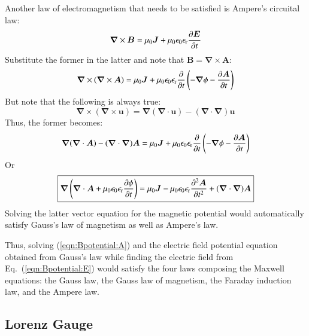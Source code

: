 \documentclass{warpdoc}
\newcommand\frameeqn[1]{\fbox{$\displaystyle #1$}}
\renewcommand{\vec}[1]{\bm{#1}}
\begin{document}
Another law of electromagnetism that needs to be satisfied is Ampere's circuital law:
%
\begin{equation}
\vec{\nabla} \times \vec{B} = \mu_0 \vec{J} + \mu_0 \epsilon_0 \epsilon_{\rm r} \frac{\partial \vec{E}}{\partial t}
\label{eqn:amperelaw}
\end{equation}
% 
Substitute the former in the latter and note that $\vec{B}=\vec{\nabla}\times\vec{A}$:
%
\begin{equation}
\vec{\nabla} \times (\vec{\nabla}\times\vec{A}) = \mu_0 \vec{J} + \mu_0 \epsilon_0 \epsilon_{\rm r} \frac{\partial }{\partial t}\left(-\vec{\nabla} \phi -\frac{\partial \vec{A}}{\partial t} \right)
\end{equation}
% 
But note that the following is always true:
%
\begin{equation}
\vec{\nabla} \times (\vec{\nabla} \times \vec{u})= \vec{\nabla}(\vec{\nabla}\cdot\vec{u}) -  (\vec{\nabla}\cdot\vec{\nabla}) \vec{u}
\end{equation}
%
Thus, the former becomes:
%
\begin{equation}
\vec{\nabla}(\vec{\nabla}\cdot\vec{A}) -  (\vec{\nabla}\cdot\vec{\nabla}) \vec{A} = \mu_0 \vec{J} + \mu_0 \epsilon_0 \epsilon_{\rm r} \frac{\partial }{\partial t}\left(-\vec{\nabla} \phi -\frac{\partial \vec{A}}{\partial t} \right)
\end{equation}
% 
Or
%
\begin{equation}
\frameeqn{
\vec{\nabla}\left(\vec{\nabla}\cdot\vec{A}+\mu_0\epsilon_0 \epsilon_{\rm r}  \frac{\partial \phi}{\partial t}\right)  = \mu_0 \vec{J} - \mu_0 \epsilon_0 \epsilon_{\rm r} \frac{\partial^2 \vec{A} }{\partial t^2} +   (\vec{\nabla}\cdot\vec{\nabla}) \vec{A}
}
\label{eqn:Bpotential:A}
\end{equation}
% 
Solving the latter vector equation for the magnetic potential would automatically satisfy Gauss's law of magnetism as well as Ampere's law. 

Thus, solving (\ref{eqn:Bpotential:A}) and the electric field potential equation obtained from Gauss's law while finding the electric field from Eq.~(\ref{eqn:Bpotential:E}) would satisfy the four laws composing the Maxwell equations: the Gauss law, the Gauss law of magnetism, the Faraday induction law, and the Ampere law.




\subsection{Lorenz Gauge}
\end{document}
